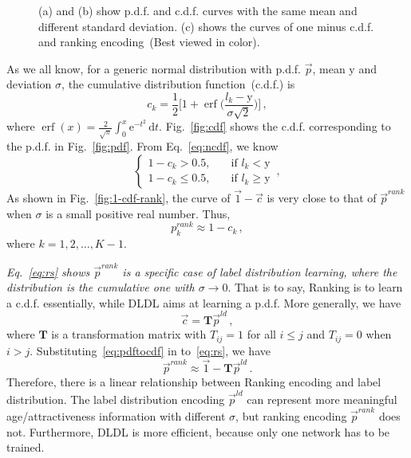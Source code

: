 \documentclass[5p,times,twocolumn]{elsarticle}
\DeclareMathOperator*{\erf}{erf}
\begin{document}
\begin{figure}[t]
 \centering
\caption{(a) and (b) show p.d.f. and c.d.f. curves with the same mean and different standard deviation. (c) shows the curves of one minus c.d.f. and ranking encoding~(Best viewed in color).} \label{fig:pdf-cdf}
\vspace{-10pt}
\end{figure}

As we all know, for a generic normal distribution with p.d.f. $\vec p$, mean $\mathrm y$ and deviation $\sigma$, the cumulative distribution function~(c.d.f.) is
\begin{equation}
 c_k = \frac{1}{2}\Bigg[1 + \erf\bigg(\frac{l_k-\mathrm y}{\sigma\sqrt 2}\bigg)\Bigg]\,,  \label{eq:ncdf}
\end{equation}
where $\erf(x) = \frac{2}{\sqrt \pi} \int_0^x \mathrm{e}^{-t^2}\,\mathrm{d}t$. 
Fig.~\ref{fig:cdf} shows the c.d.f. corresponding to the p.d.f. in Fig.~\ref{fig:pdf}. From Eq.~\eqref{eq:ncdf}, we know
\begin{equation}
\begin{cases}
 1-c_k > 0.5, & \quad \text{if } l_k<\mathrm y \\
 1-c_k \leq 0.5, & \quad \text{if } l_k\geq\mathrm y 
 \end{cases}\,,
\end{equation}
As shown in Fig.~\ref{fig:1-cdf-rank}, the curve of $\vec 1-\vec c$ is very close to that of $\vec p^{rank}$ when $\sigma$ is a small positive real number. Thus, \begin{equation}\label{eq:rs}
 p_k^{rank} \approx 1 - c_k \,,
\end{equation}
where $k= 1,2,\ldots,K-1$. 

\emph{Eq.~\eqref{eq:rs} shows $\vec p^{rank}$ is a specific case of label distribution learning, where the distribution is the cumulative one with $\sigma \to 0$}. That is to say, Ranking is to learn a c.d.f. essentially, while DLDL aims at learning a p.d.f. More generally, we have
\begin{equation}
\vec c = \mathbf{T}\vec p^{ld} \label{eq:pdftocdf} \,,
\end{equation}
where $\mathbf{T}$ is a transformation matrix with  $T_{ij}=1$ for all $i\le j$ and $T_{ij}=0$ when $i>j$. Substituting~\eqref{eq:pdftocdf} in to~\eqref{eq:rs}, we have
\begin{equation}
\vec p^{rank}  \approx \vec 1 - \mathbf{T}\vec p^{ld} \label{eq:cdftopdf} \,.
\end{equation}
Therefore, there is a linear relationship between Ranking encoding and label distribution. The label distribution encoding $\vec p^{ld}$ can represent more meaningful age/attractiveness information with different $\sigma$, but ranking encoding  $\vec p^{rank}$ does not. Furthermore, DLDL is more efficient, because only one network has to be trained. 
\end{document}
